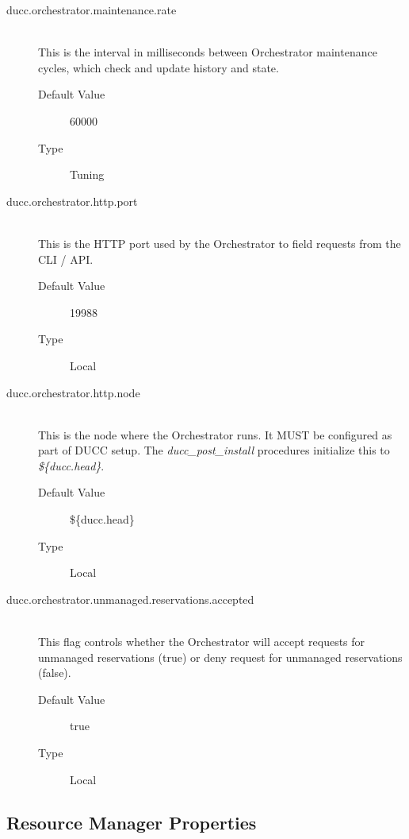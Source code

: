 \begin{description}
      \item[ducc.orchestrator.maintenance.rate] \hfill \\
        This is the interval in milliseconds between Orchestrator maintenance cycles, which check
        and update history and state. 
        \begin{description}
          \item[Default Value] 60000 
          \item[Type] Tuning 
        \end{description}
        
      \item[ducc.orchestrator.http.port] \hfill \\
        This is the HTTP port used by the Orchestrator to field requests from the CLI / API. 
        \begin{description}          
          \item[Default Value] 19988
          \item[Type] Local 
        \end{description}
        
      \item[ducc.orchestrator.http.node] \hfill \\
        This is the node where the Orchestrator runs. It MUST be configured as part of DUCC 
        setup. The {\em ducc\_post\_install} procedures initialize this to {\em \$\{ducc.head\}}.
        \begin{description}
          \item[Default Value] \$\{ducc.head\}
          \item[Type] Local 
        \end{description}
        
      \item[ducc.orchestrator.unmanaged.reservations.accepted] \hfill \\
        This flag controls whether the Orchestrator will accept requests for
        unmanaged reservations (true) or deny request for unmanaged reservations
        (false).
        \begin{description}
          \item[Default Value] true
          \item[Type] Local 
        \end{description}      
      \end{description}

\subsection{Resource Manager Properties}

